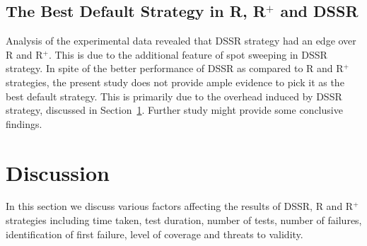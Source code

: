 
\subsection{The Best Default Strategy in R, R$^+$ and DSSR}

Analysis of the experimental data revealed that DSSR strategy had an edge over R and R$^+$. This is due to the additional feature of spot sweeping in DSSR strategy. In spite of the better performance of DSSR as compared to R and R$^+$ strategies, the present study does not provide ample evidence to pick it as the best default strategy. This is primarily due to the overhead induced by DSSR strategy, discussed in Section~\ref{sec:discussion3}. Further study might provide some conclusive findings. 





\section{Discussion}\label{sec:discussion3}
In this section we discuss various factors affecting the results of DSSR, R and R$^+$ strategies including time taken, test duration, number of tests, number of failures, identification of first failure, level of coverage and threats to validity.

